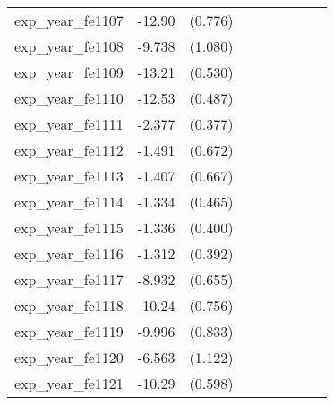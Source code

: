 {\begin{tabular}{l*{4}{cc}}
exp\_year\_fe1107&   -12.90\sym{***}&  (0.776)&                  &         &                  &         &                  &         \\
exp\_year\_fe1108&   -9.738\sym{***}&  (1.080)&                  &         &                  &         &                  &         \\
exp\_year\_fe1109&   -13.21\sym{***}&  (0.530)&                  &         &                  &         &                  &         \\
exp\_year\_fe1110&   -12.53\sym{***}&  (0.487)&                  &         &                  &         &                  &         \\
exp\_year\_fe1111&   -2.377\sym{***}&  (0.377)&                  &         &                  &         &                  &         \\
exp\_year\_fe1112&   -1.491\sym{*}  &  (0.672)&                  &         &                  &         &                  &         \\
exp\_year\_fe1113&   -1.407\sym{*}  &  (0.667)&                  &         &                  &         &                  &         \\
exp\_year\_fe1114&   -1.334\sym{**} &  (0.465)&                  &         &                  &         &                  &         \\
exp\_year\_fe1115&   -1.336\sym{***}&  (0.400)&                  &         &                  &         &                  &         \\
exp\_year\_fe1116&   -1.312\sym{***}&  (0.392)&                  &         &                  &         &                  &         \\
exp\_year\_fe1117&   -8.932\sym{***}&  (0.655)&                  &         &                  &         &                  &         \\
exp\_year\_fe1118&   -10.24\sym{***}&  (0.756)&                  &         &                  &         &                  &         \\
exp\_year\_fe1119&   -9.996\sym{***}&  (0.833)&                  &         &                  &         &                  &         \\
exp\_year\_fe1120&   -6.563\sym{***}&  (1.122)&                  &         &                  &         &                  &         \\
exp\_year\_fe1121&   -10.29\sym{***}&  (0.598)&                  &         &                  &         &                  &         \\

\end{tabular}}
